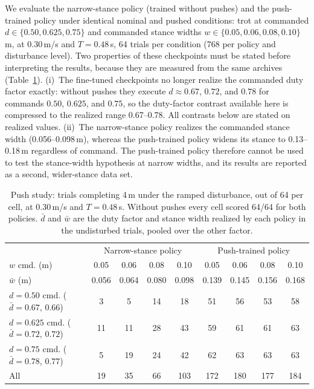 We evaluate the narrow-stance policy (trained without pushes) and the
push-trained policy under identical nominal and pushed conditions: trot at
commanded $d\in\{0.50,0.625,0.75\}$ and commanded stance widths
$w\in\{0.05,0.06,0.08,0.10\}$\,m, at 0.30\,m/s and $T=0.48$\,s, 64 trials per
condition (768 per policy and disturbance level). Two properties of these
checkpoints must be stated before interpreting the results, because they are
measured from the same archives (Table~\ref{tab:inv3_push}). (i)~The
fine-tuned checkpoints no longer realize the commanded duty factor exactly:
without pushes they execute $d\approx0.67$, $0.72$, and $0.78$ for commands
$0.50$, $0.625$, and $0.75$, so the duty-factor contrast available here is
compressed to the realized range 0.67--0.78. All contrasts below are stated
on realized values. (ii)~The narrow-stance policy realizes the commanded
stance width (0.056--0.098\,m), whereas the push-trained policy widens its
stance to 0.13--0.18\,m regardless of command. The push-trained policy
therefore cannot be used to test the stance-width hypothesis at narrow
widths, and its results are reported as a second, wider-stance data set.

\begin{table}[t]
    \centering
    \caption{Push study: trials completing 4\,m under the ramped disturbance,
    out of 64 per cell, at 0.30\,m/s and $T=0.48$\,s. Without pushes every
    cell scored 64/64 for both policies. $\bar d$ and $\bar w$ are the duty
    factor and stance width realized by each policy in the undisturbed trials,
    pooled over the other factor.}
    \label{tab:inv3_push}
    \begin{tabular}{lcccc|cccc}
        & \multicolumn{4}{c|}{Narrow-stance policy} & \multicolumn{4}{c}{Push-trained policy} \\
        $w$ cmd. (m) & 0.05 & 0.06 & 0.08 & 0.10 & 0.05 & 0.06 & 0.08 & 0.10 \\
        $\bar w$ (m) & 0.056 & 0.064 & 0.080 & 0.098 & 0.139 & 0.145 & 0.156 & 0.168 \\
        \thickhline
        $d=0.50$ cmd. ($\bar d=0.67$, $0.66$)  & 3  & 5  & 14 & 18 & 51 & 56 & 53 & 58 \\
        $d=0.625$ cmd. ($\bar d=0.72$, $0.72$) & 11 & 11 & 28 & 43 & 59 & 61 & 61 & 63 \\
        $d=0.75$ cmd. ($\bar d=0.78$, $0.77$)  & 5  & 19 & 24 & 42 & 62 & 63 & 63 & 63 \\
        \hline
        All & 19 & 35 & 66 & 103 & 172 & 180 & 177 & 184 \\
    \end{tabular}
\end{table}

